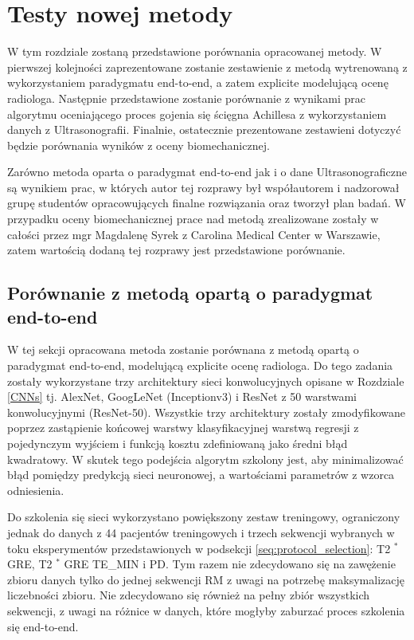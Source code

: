 \chapter{Testy nowej metody}

W tym rozdziale zostaną przedstawione porównania opracowanej metody. W pierwszej kolejności zaprezentowane zostanie zestawienie z metodą wytrenowaną z wykorzystaniem paradygmatu end-to-end, a zatem explicite modelującą ocenę radiologa. Następnie przedstawione zostanie porównanie z wynikami prac algorytmu oceniającego proces gojenia się ścięgna Achillesa z wykorzystaniem danych z Ultrasonografii. Finalnie, ostatecznie prezentowane zestawieni dotyczyć będzie porównania wyników z oceny biomechanicznej.

Zarówno metoda oparta o paradygmat end-to-end jak i o dane Ultrasonograficzne są wynikiem prac, w których autor tej rozprawy był współautorem i nadzorował grupę studentów opracowujących finalne rozwiązania oraz tworzył plan badań. W przypadku oceny biomechanicznej prace nad metodą zrealizowane zostały w całości przez mgr Magdalenę Syrek z Carolina Medical Center w Warszawie, zatem wartością dodaną tej rozprawy jest przedstawione porównanie.   

\section{Porównanie z metodą opartą o paradygmat end-to-end}

W tej sekcji opracowana metoda zostanie porównana z metodą opartą o paradygmat end-to-end, modelującą explicite ocenę radiologa. Do tego zadania zostały wykorzystane trzy architektury sieci konwolucyjnych opisane w Rozdziale \ref{CNNs} tj. AlexNet, GoogLeNet (Inceptionv3) i ResNet z 50 warstwami konwolucyjnymi (ResNet-50). Wszystkie trzy architektury zostały zmodyfikowane poprzez zastąpienie końcowej warstwy klasyfikacyjnej warstwą regresji z pojedynczym wyjściem i funkcją kosztu zdefiniowaną jako średni błąd kwadratowy. W skutek tego podejścia algorytm szkolony jest, aby minimalizować błąd pomiędzy predykcją sieci neuronowej, a wartościami parametrów z wzorca odniesienia. 

Do szkolenia się sieci wykorzystano powiększony zestaw treningowy, ograniczony jednak do danych z 44 pacjentów treningowych i trzech sekwencji wybranych w toku eksperymentów przedstawionych w podsekcji \ref{seq:protocol_selection}: T2 $^\ast$ GRE, T2 $^\ast$ GRE TE\_MIN i PD. Tym razem nie zdecydowano się na zawężenie zbioru danych tylko do jednej sekwencji RM z uwagi na potrzebę maksymalizację liczebności zbioru. Nie zdecydowano się również na pełny zbiór wszystkich sekwencji, z uwagi na różnice w danych, które mogłyby zaburzać proces szkolenia się end-to-end. 

